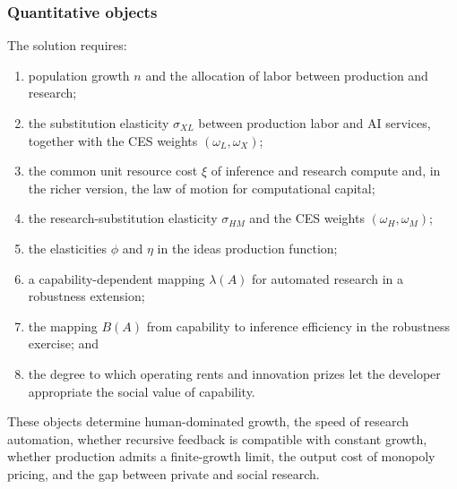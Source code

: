 \subsubsection{Quantitative objects}

The solution requires:
\begin{enumerate}[label=(\roman*)]
    \item population growth $n$ and the allocation of labor between production and
    research;
    \item the substitution elasticity $\sigma_{XL}$ between production labor and AI
    services, together with the CES weights $(\omega_L,\omega_X)$;
    \item the common unit resource cost $\xi$ of inference and research compute and,
    in the richer version, the law of motion for computational capital;
    \item the research-substitution elasticity $\sigma_{HM}$ and the CES weights
    $(\omega_H,\omega_M)$;
    \item the elasticities $\phi$ and $\eta$ in the ideas production function;
    \item a capability-dependent mapping $\lambda(A)$ for automated research in a
    robustness extension;
    \item the mapping $B(A)$ from capability to inference efficiency in the
    robustness exercise; and
    \item the degree to which operating rents and innovation prizes let the
    developer appropriate the social value of capability.
\end{enumerate}
These objects determine human-dominated growth, the speed of research automation,
whether recursive feedback is compatible with constant growth, whether production
admits a finite-growth limit, the output cost of monopoly pricing, and the gap
between private and social research.

